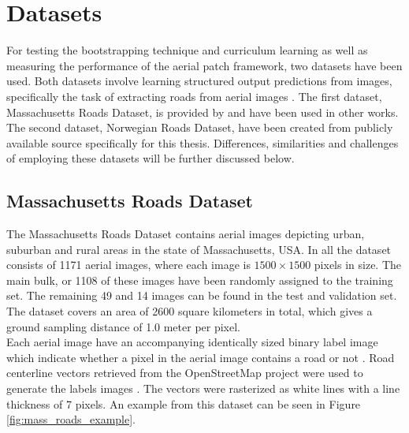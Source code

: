 \section{Datasets}
\label{sec:datasets}
For testing the bootstrapping technique and curriculum learning as well as measuring the performance of the aerial patch framework, two datasets have been used. Both datasets involve learning structured output predictions from images, specifically the task of extracting roads from aerial images . The first dataset, Massachusetts Roads Dataset, is provided by \cite{MnihThesis} and have been used in other works. The second dataset, Norwegian Roads Dataset, have been created from publicly available source specifically for this thesis. Differences, similarities and challenges of employing these datasets will be further discussed below.\\

\subsection{Massachusetts Roads Dataset}
The Massachusetts Roads Dataset contains aerial images depicting urban, suburban and rural areas in the state of Massachusetts, USA. In all the dataset consists of 1171 aerial images, where each image is $1500\times 1500$ pixels in size. The main bulk, or 1108 of these images have been randomly assigned to the training set. The remaining 49 and 14 images can be found in the test and validation set. The dataset covers an area of 2600 square kilometers in total, which gives a ground sampling distance of 1.0 meter per pixel.\\

Each aerial image have an accompanying identically sized binary label image which indicate whether a pixel in the aerial image contains a road or not . Road centerline vectors retrieved from the OpenStreetMap project were used to generate the labels images \citep{MnihThesis}. The vectors were rasterized as white lines with a line thickness of 7 pixels. An example from this dataset can be seen in Figure \ref{fig:mass_roads_example}.  \\

